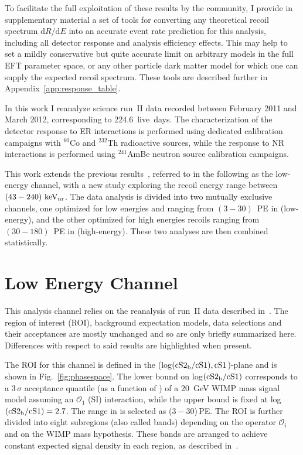 To facilitate the full exploitation of these results by the community, I provide in supplementary material a set of tools for converting any theoretical recoil spectrum $\mathrm{d}R/\mathrm{d}E$ into an accurate event rate prediction for this analysis, including all detector response and analysis efficiency effects. This may help to set a mildly conservative but quite accurate limit on arbitrary models in the full EFT parameter space, or any other particle dark matter model for which one can supply the expected recoil spectrum. These tools are described further in Appendix~\ref{app:response_table}.

In this work I reanalyze science run~II data recorded between February 2011 and March 2012, corresponding to 224.6~live~days. The characterization of the detector response to ER interactions is performed using dedicated calibration campaigns with $^{60}$Co and $^{232}$Th radioactive sources, while the response to NR interactions is performed using $^{241}$AmBe neutron source calibration campaigns.
 
This work extends the previous results~\cite{xe100_run10_si,xe100_run_combination}, referred to in the following as the low-energy channel, with a new study exploring the recoil energy range between $(43-240)~\mathrm{keV_\mathrm{nr}}$. 
The data analysis is divided into two mutually exclusive channels, one optimized for low energies and ranging from $(3-30)$~PE in \cSi{} (low-energy), 
and the other optimized for high energies recoils ranging from $(30-180)$~PE in \cSi{} (high-energy). These two analyses are then combined statistically. 


\section{Low Energy Channel}
\label{subsec:LowE}
This analysis channel relies on the reanalysis of run~II data described in~\cite{xe100_run_combination}. The region of interest (ROI), background 
expectation models, data selections and their acceptances are mostly unchanged and so are only briefly summarized here. Differences with respect to said results are highlighted when present.

The ROI for this channel is defined in the (log$(\mathrm{cS2}_\mathrm{b}{}/\mathrm{cS1}{}),\mathrm{cS1}{}$)-plane and is shown in Fig.~\ref{fig:phasespace}.  The lower 
bound on log$(\mathrm{cS2}_\mathrm{b}{}/\mathrm{cS1}{})$ corresponds to a 3\,$\sigma$ acceptance quantile (as a function of \cSi{}) of a 20~GeV WIMP mass signal model assuming an $\mathcal{O}_1$ (SI) interaction, while the upper bound is fixed at log$(\mathrm{cS2}_\mathrm{b}{}/\mathrm{cS1}{})=2.7$.
The range in \cSi{} is selected as ($3-30$)\,PE. 
The ROI is further divided into eight subregions (also called bands) depending on the operator $\mathcal{O}_i$ and on the WIMP mass hypothesis. 
These bands are arranged to achieve constant expected signal density in each region, as described in~\cite{xe100_run_combination}.

